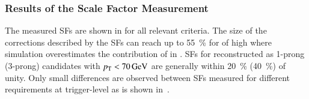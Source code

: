 




\subsubsection{Results of the Scale Factor Measurement}

The measured \faketauhadvis SFs are shown in  for
all relevant \tauid criteria. The size of the corrections described by the SFs
can reach up to \SI{55}{\percent} for \faketauhadvis of high \pT where
simulation overestimates the contribution of \faketauhadvis in \ttbar. SFs for
\faketauhadvis reconstructed as 1-prong (3-prong) candidates with
$\pT < \SI{70}{\GeV}$ are generally within \SI{20}{\percent} (\SI{40}{\percent})
of unity. Only small differences are observed between SFs measured for different
\tauid requirements at trigger-level as is shown
in~.

